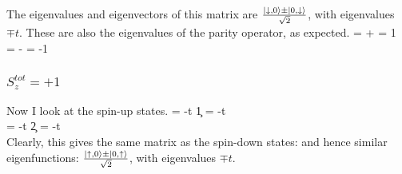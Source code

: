 \documentclass[12pt]{article}
\begin{document}
The eigenvalues and eigenvectors of this matrix are \(\frac{\ket{\downarrow,0} \pm \ket{0,\downarrow}}{\sqrt{2}}\), with eigenvalues \(\mp t\). These are also the eigenvalues of the parity operator, as expected.
\beq
{} =  +  \implies {} = 1 \\
 =  -  \implies {} = -1
\eeq
\subsubsection{\(S_z^{tot} = +1\)}
Now I look at the spin-up states.
\beq
\ham{} = -t \c{1}{\uparrow} = -t \\
\ham{} = -t \c{2}{\uparrow} = -t \\
\eeq
Clearly, this gives the same matrix as the spin-down states:
\beq
{}
\eeq
and hence similar eigenfunctions: \(\frac{\ket{\uparrow,0} \pm \ket{0,\uparrow}}{\sqrt{2}}\), with eigenvalues \(\mp t\).
\end{document}
